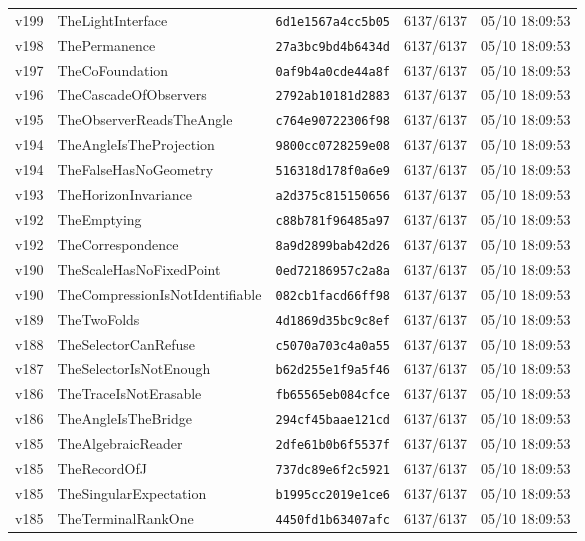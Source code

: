 \documentclass[11pt]{article}
\theoremstyle{definition}\newtheorem{deriv}{Derivation}
\begin{document}
{\begin{longtable}{@{}lllll@{}}
v199 & TheLightInterface & \texttt{6d1e1567a4cc5b05} & 6137/6137 & 05/10 18:09:53 \\
v198 & ThePermanence & \texttt{27a3bc9bd4b6434d} & 6137/6137 & 05/10 18:09:53 \\
v197 & TheCoFoundation & \texttt{0af9b4a0cde44a8f} & 6137/6137 & 05/10 18:09:53 \\
v196 & TheCascadeOfObservers & \texttt{2792ab10181d2883} & 6137/6137 & 05/10 18:09:53 \\
v195 & TheObserverReadsTheAngle & \texttt{c764e90722306f98} & 6137/6137 & 05/10 18:09:53 \\
v194 & TheAngleIsTheProjection & \texttt{9800cc0728259e08} & 6137/6137 & 05/10 18:09:53 \\
v194 & TheFalseHasNoGeometry & \texttt{516318d178f0a6e9} & 6137/6137 & 05/10 18:09:53 \\
v193 & TheHorizonInvariance & \texttt{a2d375c815150656} & 6137/6137 & 05/10 18:09:53 \\
v192 & TheEmptying & \texttt{c88b781f96485a97} & 6137/6137 & 05/10 18:09:53 \\
v192 & TheCorrespondence & \texttt{8a9d2899bab42d26} & 6137/6137 & 05/10 18:09:53 \\
v190 & TheScaleHasNoFixedPoint & \texttt{0ed72186957c2a8a} & 6137/6137 & 05/10 18:09:53 \\
v190 & TheCompressionIsNotIdentifiable & \texttt{082cb1facd66ff98} & 6137/6137 & 05/10 18:09:53 \\
v189 & TheTwoFolds & \texttt{4d1869d35bc9c8ef} & 6137/6137 & 05/10 18:09:53 \\
v188 & TheSelectorCanRefuse & \texttt{c5070a703c4a0a55} & 6137/6137 & 05/10 18:09:53 \\
v187 & TheSelectorIsNotEnough & \texttt{b62d255e1f9a5f46} & 6137/6137 & 05/10 18:09:53 \\
v186 & TheTraceIsNotErasable & \texttt{fb65565eb084cfce} & 6137/6137 & 05/10 18:09:53 \\
v186 & TheAngleIsTheBridge & \texttt{294cf45baae121cd} & 6137/6137 & 05/10 18:09:53 \\
v185 & TheAlgebraicReader & \texttt{2dfe61b0b6f5537f} & 6137/6137 & 05/10 18:09:53 \\
v185 & TheRecordOfJ & \texttt{737dc89e6f2c5921} & 6137/6137 & 05/10 18:09:53 \\
v185 & TheSingularExpectation & \texttt{b1995cc2019e1ce6} & 6137/6137 & 05/10 18:09:53 \\
v185 & TheTerminalRankOne & \texttt{4450fd1b63407afc} & 6137/6137 & 05/10 18:09:53 \\

\end{longtable}}
\end{document}
